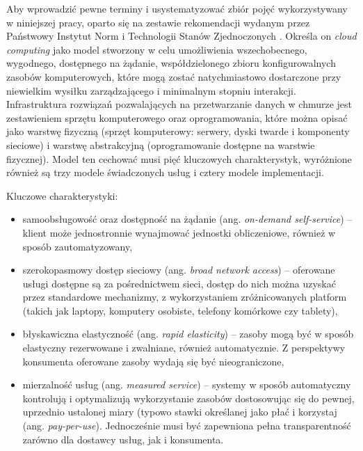 \documentclass[12pt,a4paper,twoside]{article}
\begin{document}
Aby wprowadzić pewne terminy i usystematyzować zbiór pojęć wykorzystywany w niniejszej pracy, oparto się na zestawie rekomendacji wydanym przez Państwowy Instytut Norm i Technologii Stanów Zjednoczonych \citep{mell2011}. Określa on \textit{cloud computing} jako model stworzony w celu umożliwienia wszechobecnego, wygodnego, dostępnego na żądanie, współdzielonego zbioru konfigurowalnych zasobów komputerowych, które mogą zostać natychmiastowo dostarczone przy niewielkim wysiłku zarządzającego i minimalnym stopniu interakcji. Infrastruktura rozwiązań pozwalających na przetwarzanie danych w chmurze jest zestawieniem sprzętu komputerowego oraz oprogramowania, które można opisać jako warstwę fizyczną (sprzęt komputerowy: serwery, dyski twarde i komponenty sieciowe) i warstwę abstrakcyjną (oprogramowanie dostępne na warstwie fizycznej). Model ten cechować musi pięć kluczowych charakterystyk, wyróżnione również są trzy modele świadczonych usług i cztery modele implementacji.

\noindent
Kluczowe charakterystyki:
\begin{itemize}
\item samoobsługowość oraz dostępność na żądanie (ang. \textit{on-demand self-service}) -- klient może jednostronnie wynajmować jednostki obliczeniowe, również w sposób zautomatyzowany,
\item szerokopasmowy dostęp sieciowy (ang. \textit{broad network access}) -- oferowane usługi dostępne są za pośrednictwem sieci, dostęp do nich można uzyskać przez standardowe mechanizmy, z wykorzystaniem zróżnicowanych platform (takich jak laptopy, komputery osobiste, telefony komórkowe czy tablety),
\item błyskawiczna elastyczność (ang. \textit{rapid elasticity}) -- zasoby mogą być w sposób elastyczny rezerwowane i zwalniane, również automatycznie. Z perspektywy konsumenta oferowane zasoby wydają się być nieograniczone,
\item mierzalność usług (ang. \textit{measured service}) -- systemy w sposób automatyczny kontrolują i optymalizują wykorzystanie zasobów dostosowując się do pewnej, uprzednio ustalonej miary (typowo stawki określanej jako płać i korzystaj (ang. \textit{pay-per-use}). Jednocześnie musi być zapewniona pełna transparentność zarówno dla dostawcy usług, jak i konsumenta.
\end{itemize}
\end{document}
